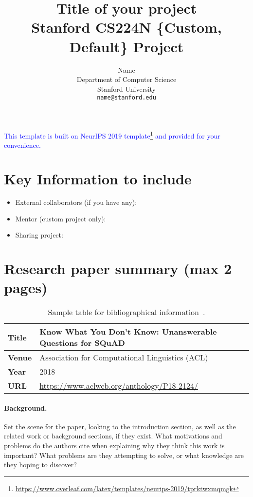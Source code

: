 \documentclass{article}
\title{
  Title of your project \\
  \vspace{1em}
  \small{\normalfont Stanford CS224N \{Custom, Default\} Project}  %
}
\author{
  Name \\
  Department of Computer Science \\
  Stanford University \\
  \texttt{name@stanford.edu} \\
}
\newcommand{\note}[1]{\textcolor{blue}{{#1}}}
\begin{document}
\maketitle



\note{This template is built on NeurIPS 2019 template\footnote{\url{https://www.overleaf.com/latex/templates/neurips-2019/tprktwxmqmgk}} and provided for your convenience.}


\section{Key Information to include}

\begin{itemize}
    \item External collaborators (if you have any):
    \item Mentor (custom project only):
    \item Sharing project:
\end{itemize}


\section{Research paper summary (max 2 pages)}

\begin{table}[h]
    \centering
    \begin{tabular}{ll}
        \toprule
        \textbf{Title} & Know What You Don't Know: Unanswerable Questions for SQuAD \\
        \midrule
        \textbf{Venue} & Association for Computational Linguistics (ACL) \\
        \textbf{Year}  & 2018 \\
        \textbf{URL}   & \url{https://www.aclweb.org/anthology/P18-2124/} \\
        \bottomrule
    \end{tabular}
    \vspace{1em}
    \caption{Sample table for bibliographical information~\cite{rajpurkar2018know}.}
\end{table}

\paragraph{Background.}
Set the scene for the paper, looking to the introduction section, as well as the related work or background sections, if they exist.
What motivations and problems do the authors cite when explaining why they think this work is important? 
What problems are they attempting to solve, or what knowledge are they hoping to discover?
\end{document}

